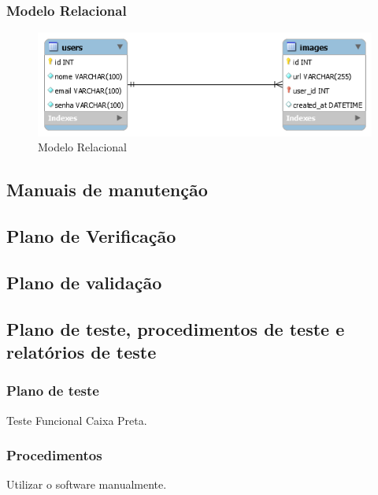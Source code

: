 \subsubsection{Modelo Relacional} 
\begin{figure}[ht]
	\centering
	\includegraphics[width=\textwidth]{./imagens/der.png}
	\caption{Modelo Relacional}
	\label{fig:modeloRelacional}
\end{figure}

\subsection{Manuais de manutenção}

\subsection{Plano de Verificação}

\subsection{Plano de validação}

\subsection{Plano de teste, procedimentos de teste e relatórios de teste}

\subsubsection{Plano de teste}

Teste Funcional Caixa Preta.

\subsubsection{Procedimentos}

Utilizar o software manualmente.

